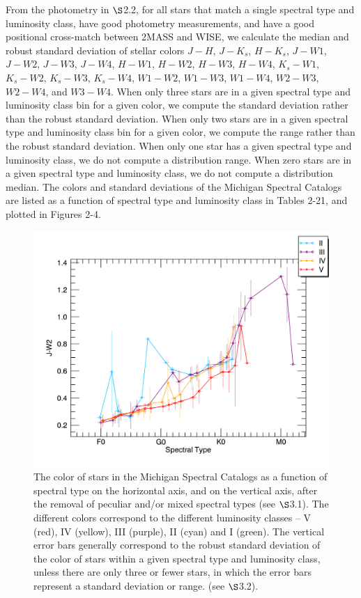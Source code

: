 From the photometry in ${\S}$2.2, for all stars that match a single spectral type and luminosity class, have good photometry measurements, and have a good positional cross-match between 2MASS and WISE, we calculate the median and robust standard deviation of stellar colors $J-H$, $J-K_s$, $H-K_s$, $J-W1$, $J-W2$, $J-W3$, $J-W4$, $H-W1$, $H-W2$, $H-W3$, $H-W4$, $K_s-W1$, $K_s-W2$, $K_s-W3$, $K_s-W4$, $W1-W2$, $W1-W3$, $W1-W4$, $W2-W3$, $W2-W4$, and $W3-W4$.  When only three stars are in a given spectral type and luminosity class bin for a given color, we compute the standard deviation rather than the robust standard deviation.  When only two stars are in a given spectral type and luminosity class bin for a given color, we compute the range rather than the robust standard deviation.  When only one star has a given spectral type and luminosity class, we do not compute a distribution range.  When zero stars are in a given spectral type and luminosity class, we do not compute a distribution median.  The colors and standard deviations of the Michigan Spectral Catalogs are listed as a function of spectral type and luminosity class in Tables 2-21, and plotted in Figures 2-4.


\begin{figure}[t]
\centering
\includegraphics[width=1.0\textwidth,clip=true]{Figures/subtype_bar/SPT_J-W2.png}
 
\caption{The color of stars in the Michigan Spectral Catalogs as a function of spectral type on the horizontal axis, and \jwtwo on the vertical axis, after the removal of peculiar and/or mixed spectral types (see ${\S}$3.1). The different colors correspond to the different luminosity classes -- V (red), IV (yellow), III (purple), II (cyan) and I (green).  The vertical error bars generally correspond to the robust standard deviation of the \jwtwo color of stars within a given spectral type and luminosity class, unless there are only three or fewer stars, in which the error bars represent a standard deviation or range. (see ${\S}$3.2).}
\end{figure}

